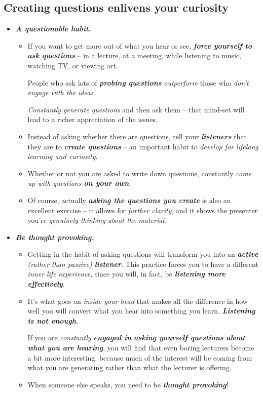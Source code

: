 \documentclass[11pt]{article}
\begin{document}
\subsection{Creating questions enlivens your curiosity}
\begin{itemize}
\item \emph{\textbf{A questionable habit. }}
\begin{itemize}
\item If you want to get more out of what you hear or see, \emph{\textbf{force yourself to ask questions}} -- in a lecture, at a meeting, while listening to music, watching TV, or viewing art. 

People who ask lots of \emph{\textbf{probing questions}} \emph{outperform} those who \emph{don’t engage with the ideas}. 

\emph{Constantly generate questions} and then ask them -- that mind-set will lead to a richer appreciation of the issues.

\item Instead of asking whether there are questions, tell your \emph{\textbf{listeners}} that they are to \emph{\textbf{create questions}} -- an important habit to \emph{develop for lifelong learning and curiosity}.

\item Whether or not you are asked to write down questions, constantly \emph{come up with questions \textbf{on your own}}.

\item Of course, actually \emph{\textbf{asking the questions you create}} is also an excellent exercise -- it allows for \emph{further clarity}, and it shows the presenter you’re \emph{genuinely thinking about the material}. 
\end{itemize}


\item \emph{\textbf{Be thought provoking.}}
\begin{itemize}
\item Getting in the habit of asking questions will transform you into an \emph{\textbf{active} (rather than passive) \textbf{listener}}. This practice forces you to have a different \emph{inner life experience}, since you will, in fact, be \emph{\textbf{listening more effectively}}. 

\item It’s what goes on \emph{inside your head} that makes all the difference in how well you will convert what you hear into something you learn. \emph{\textbf{Listening is not enough}}.

If you are \emph{constantly \textbf{engaged in} \textbf{asking yourself questions about what you are hearing}}, you will find that even boring lecturers become a bit more interesting, because much of the interest will be coming from what you are generating rather than what the lecturer is offering. 

\item When someone else speaks, you need to be \emph{\textbf{thought provoking}}!
\end{itemize}
\end{itemize}
\end{document}

